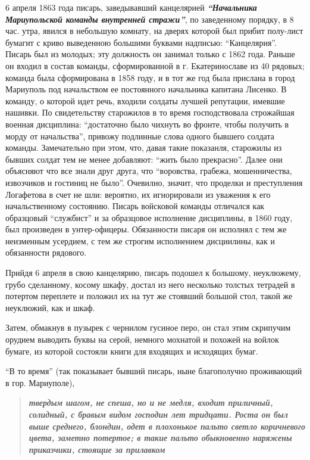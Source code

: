 6 апреля 1863 года писарь, заведывавший канцелярией 
\textbf{\em ``Начальника Мариупольской команды внутренней стражи''},
по заведенному порядку, в 8 час. утра, явился в небольшую комнату, на дверях которой был прибит полу-лист
бумагит с криво выведенною большими буквами надписью: ``Канцелярия''. Писарь был из молодых; эту должность он занимал только с 1862 года.
Раньше он входил в состав команды, сформированной в г. Екатеринославе из 40 рядовых; команда была сформирована в 1858 году, и в тот же год была прислана в город Мариуполь под начальством ее постоянного начальника капитана Лисенко. 
В команду, о которой идет речь, входили солдаты лучшей репутации, имевшие нашивки. По свидетельству старожилов
в то время господствовала строжайшая военная
дисциплина: ``достаточно было чихнуть во фронте, чтобы
получить в морду от начальства'', привожу подлинные
слова одного бывшего солдата команды. Замечательно при
этом, что, давая такие показанля, старожилы из бывших
солдат тем не менее добавляют: ``жить было прекрасно''.
Далее они объясняют что все знали друг друга, что 
``воровства, грабежа, мошенничества, извозчиков и гостиниц
не было''. Очевилно, значит, что проделки и преступления Логафетова в счет не шли: вероятно, их
игнорировали из уважения к его начальственному состоянию.
Писарь войсковой команды отличался как образцовый ``службист'' и за образцовое
исполнение дисциплины, в 1860 году, был произведен в унтер-офицеры. Обязанности
писаря он исполнял с тем же неизменным усердием, с тем же строгим исполнением
дисциилины, как и обязанности рядового.

Прийдя 6 апреля в свою канцелярию, писарь подошел к большому, неуклюжему, грубо сделанному,
косому шкафу, достал из него несколько толстых тетрадей в потертом переплете и положил их на тут же
стоявший большой стол, такой же неуклюжий, как и шкаф.

Затем, обмакнув в пузырек с чернилом гусиное перо, он стал этим скрипучим
орудием выводить буквы на серой, немного мохнатой и похожей на войлок бумаге,
из которой состояли книги для входящих и исходящих бумаг.

``В то время'' (так показывает бывший писарь, ныне благополучно проживающий в гор. Мариуполе), 
\begin{quote}
\bfseries\em
твердым шагом, не спеша, но и не медля, входит приличный, 
солидный, с бравым видом господин лет тридцати. Роста он был выше среднего, блондин, одет в плохонькое пальто
светло коричневого цвета, заметно потертое; в такие пальто обыкновенно наряжены приказчики, стоящие за прилавком
\end{quote}


